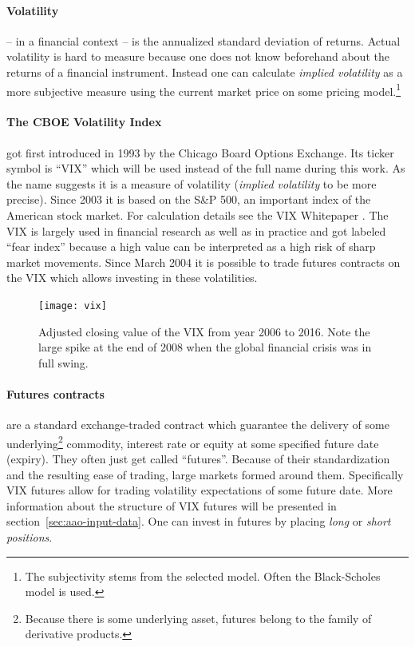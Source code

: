 \paragraph{Volatility} -- in a financial context -- is the annualized standard deviation of returns. Actual volatility is hard to measure because one does not know beforehand about the returns of a financial instrument. Instead one can calculate \emph{implied volatility} as a more subjective measure using the current market price on some pricing model.\footnote{%
	The subjectivity stems from the selected model. Often the Black-Scholes model is used.}\cite{wilmottwiki-volatility} 

\paragraph{The CBOE Volatility Index} got first introduced in 1993 by the Chicago Board Options Exchange. Its ticker symbol is ``VIX'' which will be used instead of the full name during this work. As the name suggests it is a measure of volatility (\emph{implied volatility} to be more precise). Since 2003 it is based on the S\&P 500, an important index of the American stock market. For calculation details see the VIX Whitepaper \cite{VIX}. The VIX is largely used in financial research as well as in practice and got labeled ``fear index'' because a high value can be interpreted as a high risk of sharp market movements. Since March 2004 it is possible to trade futures contracts on the VIX which allows investing in these volatilities.

\begin{figure}
	\centering
	\texttt{[image: vix]}
	\caption[VIX from year 2006 to 2016]{Adjusted closing value of the VIX from year 2006 to 2016. Note the large spike at the end of 2008 when the global financial crisis was in full swing.}
	\label{fig:vix}
\end{figure}


\paragraph{Futures contracts} are a standard exchange-traded contract which guarantee the delivery of some underlying\footnote{%
	Because there is some underlying asset, futures belong to the family of derivative products.} 
commodity, interest rate or equity at some specified future date (expiry).\cite{wilmottwiki-futures}
They often just get called ``futures''. Because of their standardization and the resulting ease of trading, large markets formed around them. Specifically VIX futures allow for trading volatility expectations of some future date. More information about the structure of VIX futures will be presented in section~\ref{sec:aao-input-data}. One can invest in futures by placing \emph{long} or \emph{short positions}. 

